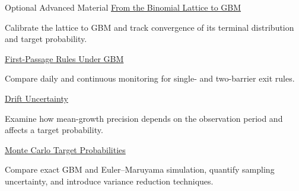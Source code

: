 \documentclass[aspectratio=169,11pt]{beamer}
\begin{document}
\begin{frame}{Optional Advanced Material}
  \textbf{}
  \href{https://github.com/varnerlab/CHEME-5660-CourseRepository-Fall-2026/blob/main/lectures/week-4/L4b/advanced/lattice-limit/CHEME-5660-L4b-Advanced-LatticeToGBM-Fall-2026.ipynb}{From the Binomial Lattice to GBM}

  Calibrate the lattice to GBM and track convergence of its terminal distribution and target probability.

  \vspace{0.45em}
  \textbf{}
  \href{https://github.com/varnerlab/CHEME-5660-CourseRepository-Fall-2026/blob/main/lectures/week-4/L4b/advanced/first-passage/CHEME-5660-L4b-Advanced-FirstPassage-GBM-Fall-2026.ipynb}{First-Passage Rules Under GBM}

  Compare daily and continuous monitoring for single- and two-barrier exit rules.

  \vspace{0.45em}
  \textbf{}
  \href{https://github.com/varnerlab/CHEME-5660-CourseRepository-Fall-2026/blob/main/lectures/week-4/L4b/advanced/drift-uncertainty/CHEME-5660-L4b-Advanced-DriftUncertainty-Fall-2026.ipynb}{Drift Uncertainty}

  Examine how mean-growth precision depends on the observation period and affects a target probability.

  \vspace{0.45em}
  \textbf{}
  \href{https://github.com/varnerlab/CHEME-5660-CourseRepository-Fall-2026/blob/main/lectures/week-4/L4b/advanced/monte-carlo/CHEME-5660-L4b-Advanced-MonteCarlo-TargetProbability-Fall-2026.ipynb}{Monte Carlo Target Probabilities}

  Compare exact GBM and Euler--Maruyama simulation, quantify sampling uncertainty,
  and introduce variance reduction techniques.

  \vspace{0.4em}
\end{frame}
\end{document}
